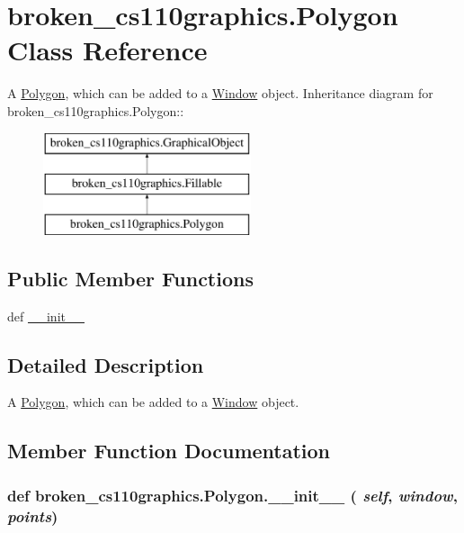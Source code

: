 \hypertarget{classbroken__cs110graphics_1_1Polygon}{
\section{broken\_\-cs110graphics.Polygon Class Reference}
\label{classbroken__cs110graphics_1_1Polygon}
}


A \hyperlink{classbroken__cs110graphics_1_1Polygon}{Polygon}, which can be added to a \hyperlink{classbroken__cs110graphics_1_1Window}{Window} object.  
Inheritance diagram for broken\_\-cs110graphics.Polygon::\begin{figure}[H]
\begin{center}
\leavevmode
\includegraphics[height=3cm]{classbroken__cs110graphics_1_1Polygon}
\end{center}
\end{figure}
\subsection*{Public Member Functions}
\begin{DoxyCompactItemize}
\item 
def \hyperlink{classbroken__cs110graphics_1_1Polygon_a6abca5168f596f86d98a1d93da75cda5}{\_\-\_\-init\_\-\_\-}
\end{DoxyCompactItemize}


\subsection{Detailed Description}
A \hyperlink{classbroken__cs110graphics_1_1Polygon}{Polygon}, which can be added to a \hyperlink{classbroken__cs110graphics_1_1Window}{Window} object. 

\subsection{Member Function Documentation}
\hypertarget{classbroken__cs110graphics_1_1Polygon_a6abca5168f596f86d98a1d93da75cda5}{
\subsubsection[{\_\-\_\-init\_\-\_\-}]{\setlength{\rightskip}{0pt plus 5cm}def broken\_\-cs110graphics.Polygon.\_\-\_\-init\_\-\_\- ( {\em self}, \/   {\em window}, \/   {\em points})}}
\label{classbroken__cs110graphics_1_1Polygon_a6abca5168f596f86d98a1d93da75cda5}

